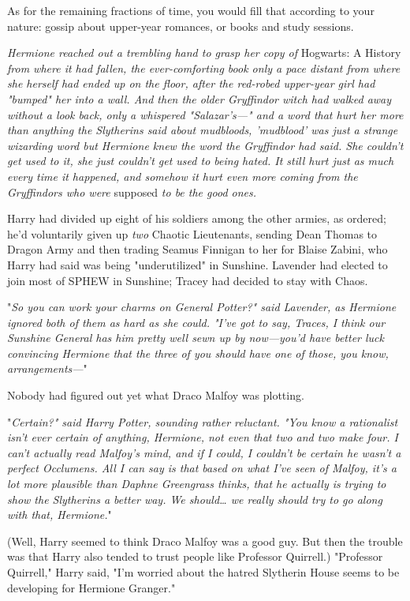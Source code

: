 As for the remaining fractions of time, you would fill that according to your 
nature: gossip about upper-year romances, or books and study sessions.

\emph{Hermione reached out a trembling hand to grasp her copy of} Hogwarts: A 
History \emph{from where it had fallen, the ever-comforting book only a pace 
distant from where she herself had ended up on the floor, after the red-robed 
upper-year girl had "bumped" her into a wall. And then the older Gryffindor 
witch had walked away without a look back, only a whispered "Salazar's---" and 
a word that hurt her more than anything the Slytherins said about mudbloods, 
'mudblood' was just a strange wizarding word but Hermione knew the word the 
Gryffindor had said. She couldn't get used to it, she just couldn't get used to 
being hated. It still hurt just as much every time it happened, and somehow it 
hurt even more coming from the Gryffindors who were} supposed \emph{to be the 
good ones.}

Harry had divided up eight of his soldiers among the other armies, as ordered; 
he'd voluntarily given up \emph{two} Chaotic Lieutenants, sending Dean Thomas 
to Dragon Army and then trading Seamus Finnigan to her for Blaise Zabini, who 
Harry had said was being "underutilized" in Sunshine. Lavender had elected to 
join most of SPHEW in Sunshine; Tracey had decided to stay with Chaos.

"\emph{So you can work your charms on General Potter?" said Lavender, as 
Hermione ignored both of them as hard as she could. "I've got to say, Traces, I 
think our Sunshine General has him pretty well sewn up by now---you'd have 
better luck convincing Hermione that the three of you should have one of those, 
you know, arrangements---}"

Nobody had figured out yet what Draco Malfoy was plotting.

"\emph{Certain?" said Harry Potter, sounding rather reluctant. "You know a 
rationalist isn't ever certain of anything, Hermione, not even that two and two 
make four. I can't actually read Malfoy's mind, and if I could, I couldn't be 
certain he wasn't a perfect Occlumens. All I can say is that based on what I've 
seen of Malfoy, it's a lot more plausible than Daphne Greengrass thinks, that 
he actually is trying to show the Slytherins a better way. We should{\ldots} we 
really should try to go along with that, Hermione.}"

(Well, Harry seemed to think Draco Malfoy was a good guy. But then the trouble 
was that Harry also tended to trust people like Professor Quirrell.)
\sbreak
"Professor Quirrell," Harry said, "I'm worried about the hatred Slytherin House 
seems to be developing for Hermione Granger."

